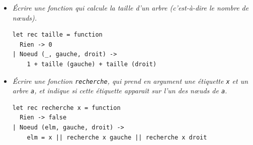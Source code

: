 \documentclass[a4paper]{article}
\begin{document}
\begin{enumerate}
\begin{itemize}
\begin{verbatim}
let max a b = if a < b then b else a
\end{verbatim}

               \smallskip

         \item \emph{Écrire une fonction qui calcule la taille d'un
               arbre (c'est-à-dire le nom\-bre de nœuds).}

               \smallskip

               \begin{verbatim}
let rec taille = function
  Rien -> 0
| Noeud (_, gauche, droit) ->
    1 + taille (gauche) + taille (droit)
               \end{verbatim}

               \smallskip

         \item \emph{Écrire une fonction {\tt recherche}, qui prend en
               argument une étiquette {\tt x} et un arbre {\tt a}, et
               indique si cette étiquette apparaît sur l'un des nœuds
               de {\tt a}.}

               \smallskip

               \begin{verbatim}
let rec recherche x = function
  Rien -> false
| Noeud (elm, gauche, droit) ->
    elm = x || recherche x gauche || recherche x droit
               \end{verbatim}
       \end{itemize}

\end{enumerate}
\end{document}
